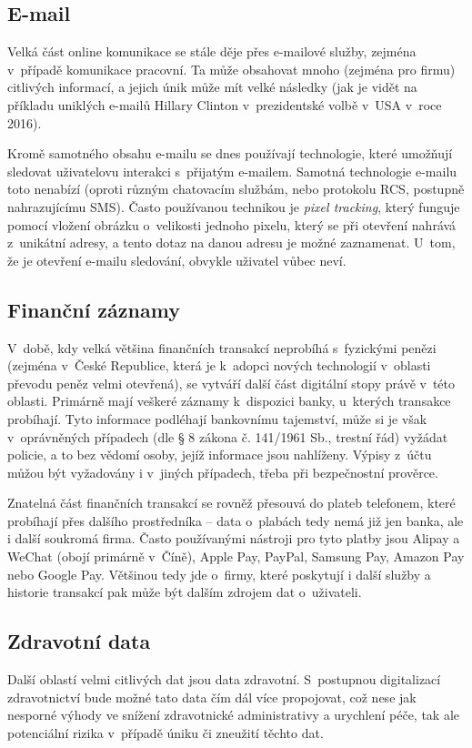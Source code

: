 \subsection{E-mail}
Velká část online komunikace se stále děje přes e-mailové služby, zejména v~případě komunikace pracovní. Ta může obsahovat mnoho (zejména pro firmu) citlivých informací, a jejich únik může mít velké následky (jak je vidět na příkladu uniklých e-mailů Hillary Clinton v~prezidentské volbě v~USA v~roce 2016).

Kromě samotného obsahu e-mailu se dnes používají technologie, které umožňují sledovat uživatelovu interakci s~přijatým e-mailem. Samotná technologie e-mailu toto nenabízí (oproti různým chatovacím službám, nebo protokolu RCS, postupně nahrazujícímu SMS). Často používanou technikou je \textit{pixel tracking}, který funguje pomocí vložení  obrázku o~velikosti jednoho pixelu, který se při otevření nahrává z~unikátní adresy, a tento dotaz na danou adresu je možné zaznamenat. U~tom, že je otevření e-mailu sledování, obvykle uživatel vůbec neví.

\subsection{Finanční záznamy}
V~době, kdy velká většina finančních transakcí neprobíhá s~fyzickými penězi (zejména v~České Republice, která je k~adopci nových technologií v~oblasti převodu peněz velmi otevřená), se vytváří další část digitální stopy právě v~této oblasti.
Primárně mají veškeré záznamy k~dispozici banky, u~kterých transakce probíhají. Tyto informace podléhají bankovnímu tajemství, může si je však v~oprávněných případech (dle § 8 zákona č. 141/1961 Sb., trestní řád) vyžádat policie, a to bez vědomí osoby, jejíž informace jsou nahlíženy. Výpisy z~účtu můžou být vyžadovány i v~jiných případech, třeba při bezpečnostní prověrce.

Znatelná část finančních transakcí se rovněž přesouvá do plateb telefonem, které probíhají přes dalšího prostředníka -- data o~plabách tedy nemá již jen banka, ale i další soukromá firma. Často používanými nástroji pro tyto platby jsou Alipay a WeChat (obojí primárně v~Číně), Apple Pay, PayPal, Samsung Pay, Amazon Pay nebo Google Pay. Většinou tedy jde o~firmy, které poskytují i další služby a historie transakcí pak může být dalším zdrojem dat o~uživateli.

\subsection{Zdravotní data}
Další oblastí velmi citlivých dat jsou data zdravotní. S~postupnou digitalizací zdravotnictví bude možné tato data čím dál více propojovat, což nese jak nesporné výhody ve snížení zdravotnické administrativy a urychlení péče, tak ale potenciální rizika v~případě úniku či zneužití těchto dat.

